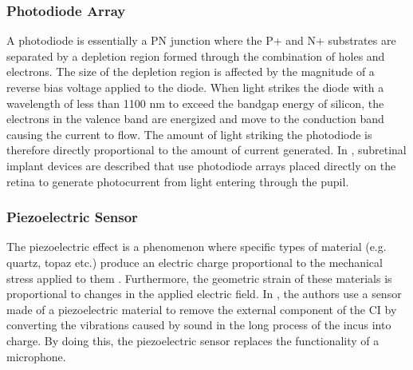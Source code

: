 \subsubsection{Photodiode Array}
A photodiode is essentially a PN junction where the P+ and N+ substrates are separated by a depletion region formed through the combination of holes and electrons. The size of the depletion region is affected by the magnitude of a reverse bias voltage applied to the diode. When light strikes the diode with a wavelength of less than 1100 nm \parencite{ida_sensors_2013} to exceed the bandgap energy of silicon, the electrons in the valence band are energized and move to the conduction band causing the current to flow. The amount of light striking the photodiode is therefore directly proportional to the amount of current generated. In \textcite{bloch_advances_2019}, subretinal implant devices are described that use photodiode arrays placed directly on the retina to generate photocurrent from light entering through the pupil.

\subsubsection{Piezoelectric Sensor}
The piezoelectric effect is a phenomenon where specific types of material (e.g. quartz, topaz etc.) produce an electric charge proportional to the mechanical stress applied to them \parencite{ida_sensors_2013}. Furthermore, the geometric strain of these materials is proportional to changes in the applied electric field. In \textcite{esinger_sensor-actuator_2019}, the authors use a sensor made of a piezoelectric material to remove the external component of the CI by converting the vibrations caused by sound in the long process of the incus into charge. By doing this, the piezoelectric sensor replaces the functionality of a microphone.


